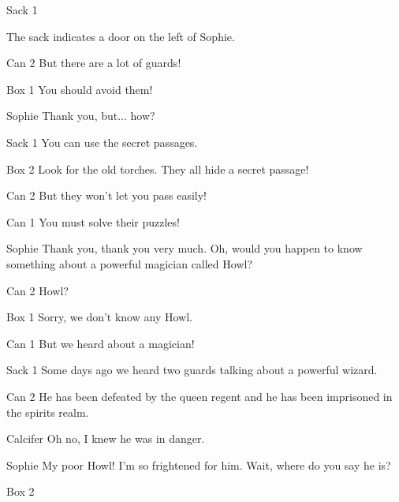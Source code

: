\begin{screenplay}
\begin{dialogue}{Sack 1}
\end{dialogue}
The sack indicates a door on the left of Sophie.
\begin{dialogue}{Can 2}
But there are a lot of guards!
\end{dialogue}
\begin{dialogue}{Box 1}
You should avoid them!
\end{dialogue}
\begin{dialogue}{Sophie}
Thank you, but... how?
\end{dialogue}
\begin{dialogue}{Sack 1}
You can use the secret passages.
\end{dialogue}
\begin{dialogue}{Box 2}
Look for the old torches. They all hide a secret passage!
\end{dialogue}
\begin{dialogue}{Can 2}
But they won't let you pass easily!
\end{dialogue}
\begin{dialogue}{Can 1}
You must solve their puzzles!
\end{dialogue}
\begin{dialogue}[grateful]{Sophie}
Thank you, thank you very much. Oh, would you happen to know something about a powerful magician called Howl?
\end{dialogue}
\begin{dialogue}{Can 2}
Howl?
\end{dialogue}
\begin{dialogue}{Box 1}
Sorry, we don’t know any Howl.
\end{dialogue}
\begin{dialogue}{Can 1}
But we heard about a magician!
\end{dialogue}
\begin{dialogue}{Sack 1}
Some days ago we heard two guards talking about a powerful wizard.
\end{dialogue}
\begin{dialogue}{Can 2}
He has been defeated by the queen regent and he has been imprisoned in the spirits realm.
\end{dialogue}
\begin{dialogue}{Calcifer}
Oh no, I knew he was in danger.
\end{dialogue}
\begin{dialogue}{Sophie}
My poor Howl! I’m so frightened for him. Wait, where do you say he is?
\end{dialogue}
\begin{dialogue}{Box 2}

\end{dialogue}
\end{screenplay}
